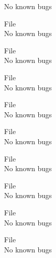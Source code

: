 \begin{DoxyRefList}
\label{bug__bug000079}%
%
No known bugs  
\item[File \doxylink{sign___8h}{sign\+\_\+.h} ]\hfill \\
\label{bug__bug000038}%
%
No known bugs  
\item[File \doxylink{timediff_8cpp}{timediff.cpp} ]\hfill \\
\label{bug__bug000080}%
%
No known bugs  
\item[File \doxylink{timediff_8h}{timediff.h} ]\hfill \\
\label{bug__bug000039}%
%
No known bugs  
\item[File \doxylink{TimeUpdate_8cpp}{Time\+Update.cpp} ]\hfill \\
\label{bug__bug000081}%
%
No known bugs  
\item[File \doxylink{TimeUpdate_8h}{Time\+Update.h} ]\hfill \\
\label{bug__bug000040}%
%
No known bugs  
\item[File \doxylink{unit_8cpp}{unit.cpp} ]\hfill \\
\label{bug__bug000082}%
%
No known bugs  
\item[File \doxylink{unit_8h}{unit.h} ]\hfill \\
\label{bug__bug000041}%
%
No known bugs  
\item[File \doxylink{VarEqn_8cpp}{Var\+Eqn.cpp} ]\hfill \\
\label{bug__bug000083}%
%
No known bugs  
\item[File \doxylink{VarEqn_8h}{Var\+Eqn.h} ]\hfill \\
\label{bug__bug000042}%
%
No known bugs 
\end{DoxyRefList}